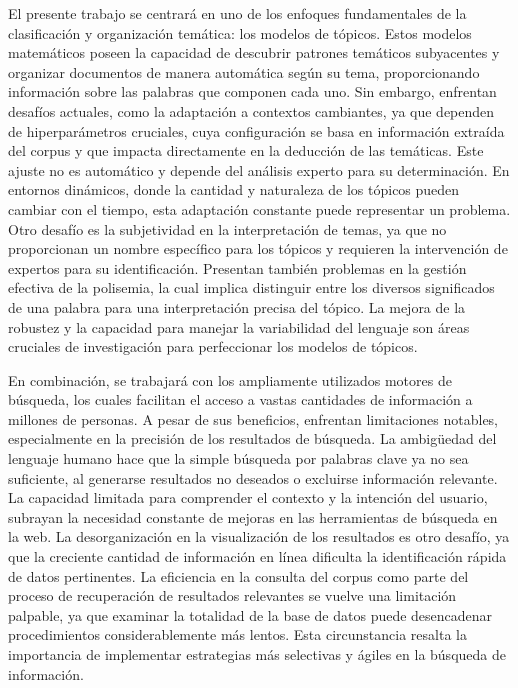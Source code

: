 El presente trabajo se centrará en uno de los enfoques fundamentales de la clasificación y organización temática: los modelos de tópicos. Estos modelos matemáticos poseen la capacidad de descubrir patrones temáticos subyacentes y organizar documentos de manera automática según su tema, proporcionando información sobre las palabras que componen cada uno. 
Sin embargo, enfrentan desafíos actuales, como la adaptación a contextos cambiantes, ya que dependen de hiperparámetros cruciales, cuya configuración se basa en información extraída del corpus
y que impacta directamente en la deducción de las temáticas. Este ajuste no es automático y depende del análisis experto para su determinaci\'on. En entornos dinámicos, donde la cantidad y naturaleza de los tópicos pueden cambiar con el tiempo, esta adaptación constante puede representar un problema. 
Otro desaf\'io es la subjetividad en la interpretación de temas, ya que no proporcionan un nombre específico para los t\'opicos y requieren la intervención de expertos para su identificación.
Presentan tambi\'en problemas en la gestión efectiva de la polisemia, la cual implica distinguir entre los diversos significados de una palabra para una interpretación precisa del tópico. La mejora de la robustez y la capacidad para manejar la variabilidad del lenguaje son áreas cruciales de investigación para perfeccionar los modelos de t\'opicos. 

En combinaci\'on, se trabajar\'a con los ampliamente utilizados motores de b\'usqueda, los cuales facilitan el acceso a vastas cantidades de información a millones de personas. A pesar de sus beneficios, enfrentan limitaciones notables, especialmente en la precisión de los resultados de b\'usqueda. La ambigüedad del lenguaje humano hace que la simple b\'usqueda por palabras clave ya no sea suficiente, al generarse resultados no deseados o excluirse información relevante. La capacidad limitada para comprender el contexto y la intención del usuario, subrayan la necesidad constante de mejoras en las herramientas de búsqueda en la web. La desorganización en la visualización de los resultados es otro desafío, ya que la creciente cantidad de información en línea dificulta la identificación rápida de datos pertinentes. La eficiencia en la consulta del corpus como parte del proceso de recuperación de resultados relevantes se vuelve una limitación palpable, ya que examinar la totalidad de la base de datos puede desencadenar procedimientos considerablemente m\'as lentos. Esta circunstancia resalta la importancia de implementar estrategias más selectivas y ágiles en la búsqueda de información. 


